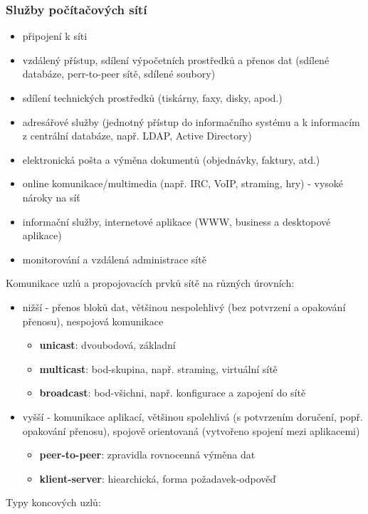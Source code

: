 \documentclass[10pt,a4paper]{article}
\begin{document}
\subsubsection{Služby počítačových sítí}
\begin{itemize}
	\item připojení k síti
	\item vzdálený přístup, sdílení výpočetních prostředků a přenos dat (sdílené databáze, perr-to-peer sítě, sdílené soubory)
	\item sdílení technických prostředků (tiskárny, faxy, disky, apod.)
	\item adresářové služby (jednotný přístup do informačního systému a k informacím z centrální databáze, např. LDAP, Active Directory)
	\item elektronická pošta a výměna dokumentů (objednávky, faktury, atd.)
	\item online komunikace/multimedia (např. IRC, VoIP, straming, hry) - vysoké nároky na síť
	\item informační služby, internetové aplikace (WWW, business a desktopové aplikace)
	\item monitorování a vzdálená administrace sítě
\end{itemize}
Komunikace uzlů a propojovacích prvků sítě na různých úrovních:
\begin{itemize}
	\item nižší - přenos bloků dat, většinou nespolehlivý (bez potvrzení a opakování přenosu), nespojová komunikace
	\begin{itemize}
		\item \textbf{unicast}: dvoubodová, základní
		\item \textbf{multicast}: bod-skupina, např. straming, virtuální sítě
		\item \textbf{broadcast}: bod-všichni, např. konfigurace a zapojení do sítě
	\end{itemize}
	\item vyšší - komunikace aplikací, většinou spolehlivá (s potvrzením doručení, popř. opakování přenosu), spojově orientovaná (vytvořeno spojení mezi aplikacemi)
	\begin{itemize}
		\item \textbf{peer-to-peer}: zpravidla rovnocenná výměna dat
		\item \textbf{klient-server}: hiearchická, forma požadavek-odpověď
	\end{itemize}
\end{itemize}
Typy koncových uzlů:
\end{document}
